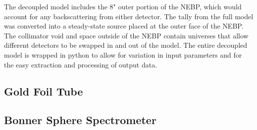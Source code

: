 The decoupled model includes the 8" outer portion of the NEBP, which would account for any backscattering from either detector.
The tally from the full model was converted into a steady-state source placed at the outer face of the NEBP.
The collimator void and space outside of the NEBP contain universes that allow different detectors to be swapped in and out of the model.
The entire decoupled model is wrapped in python to allow for variation in input parameters and for the easy extraction and processing of output data.


\subsection{Gold Foil Tube}


%




\subsection{Bonner Sphere Spectrometer}


